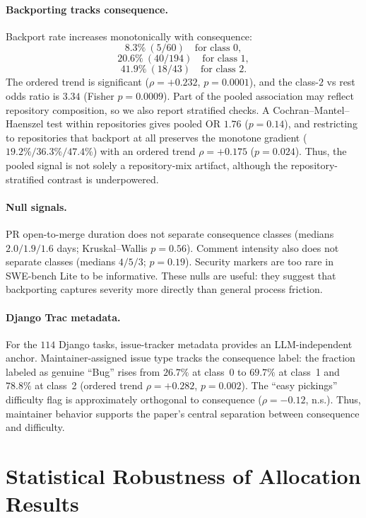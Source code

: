 \documentclass{article}
\begin{document}
\paragraph{Backporting tracks consequence.}
Backport rate increases monotonically with consequence:
\[
8.3\% \ (5/60) \quad \text{for class }0,
\]
\[
20.6\% \ (40/194) \quad \text{for class }1,
\]
\[
41.9\% \ (18/43) \quad \text{for class }2.
\]
The ordered trend is significant ($\rho=+0.232$, $p=0.0001$), and the
class-$2$ vs rest odds ratio is $3.34$ (Fisher $p=0.0009$). Part of
the pooled association may reflect repository composition, so we also
report stratified checks. A Cochran--Mantel--Haenszel test within
repositories gives pooled OR $1.76$ ($p=0.14$), and restricting to
repositories that backport at all preserves the monotone gradient
($19.2\%/36.3\%/47.4\%$) with an ordered trend
$\rho=+0.175$ ($p=0.024$). Thus, the pooled signal is not solely a
repository-mix artifact, although the repository-stratified contrast is
underpowered.

\paragraph{Null signals.}
PR open-to-merge duration does not separate consequence classes
(medians $2.0/1.9/1.6$ days; Kruskal--Wallis $p=0.56$). Comment
intensity also does not separate classes (medians $4/5/3$;
$p=0.19$). Security markers are too rare in SWE-bench Lite to be
informative. These nulls are useful: they suggest that backporting
captures severity more directly than general process friction.

\paragraph{Django Trac metadata.}
For the $114$ Django tasks, issue-tracker metadata provides an
LLM-independent anchor. Maintainer-assigned issue type tracks the
consequence label: the fraction labeled as genuine ``Bug'' rises from
$26.7\%$ at class~0 to $69.7\%$ at class~1 and $78.8\%$ at class~2
(ordered trend $\rho=+0.282$, $p=0.002$). The ``easy pickings''
difficulty flag is approximately orthogonal to consequence
($\rho=-0.12$, n.s.). Thus, maintainer behavior supports the paper's
central separation between consequence and difficulty.

\section{Statistical Robustness of Allocation Results}
\label{app:bootstrap}
\end{document}
